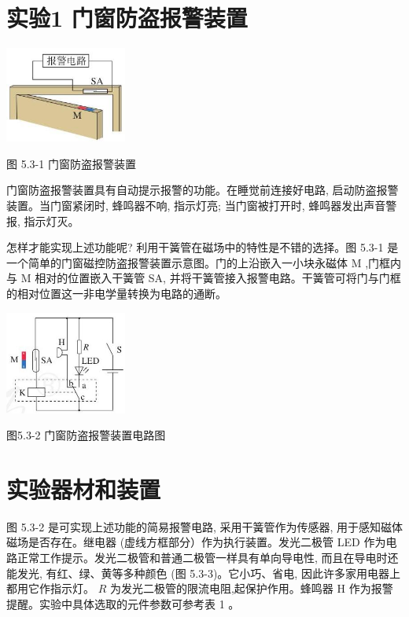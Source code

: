 \documentclass[10pt]{article}
\begin{document}
\section*{实验1 门窗防盗报警装置}

\begin{center}
\includegraphics[max width=0.3\textwidth]{images/01910e72-c5b7-7ed5-a6d4-fb3a5faefc32_108_376185.jpg}
\end{center}

图 5.3-1 门窗防盗报警装置

门窗防盗报警装置具有自动提示报警的功能。在睡觉前连接好电路, 启动防盗报警装置。当门窗紧闭时, 蜂鸣器不响, 指示灯亮; 当门窗被打开时, 蜂鸣器发出声音警报, 指示灯灭。

怎样才能实现上述功能呢? 利用干簧管在磁场中的特性是不错的选择。图 5.3-1 是一个简单的门窗磁控防盗报警装置示意图。门的上沿嵌入一小块永磁体 \(\mathrm{M}\) ,门框内与 \(\mathrm{M}\) 相对的位置嵌入干簧管 SA, 并将干簧管接入报警电路。干簧管可将门与门框的相对位置这一非电学量转换为电路的通断。

\begin{center}
\includegraphics[max width=0.3\textwidth]{images/01910e72-c5b7-7ed5-a6d4-fb3a5faefc32_108_927613.jpg}
\end{center}

图5.3-2 门窗防盗报警装置电路图

\section*{实验器材和装置}

图 5.3-2 是可实现上述功能的简易报警电路, 采用干簧管作为传感器, 用于感知磁体磁场是否存在。继电器 (虚线方框部分）作为执行装置。发光二极管 LED 作为电路正常工作提示。发光二极管和普通二极管一样具有单向导电性, 而且在导电时还能发光, 有红、绿、黄等多种颜色 (图 5.3-3)。它小巧、省电, 因此许多家用电器上都用它作指示灯。 \(R\) 为发光二极管的限流电阻,起保护作用。蜂鸣器 \(\mathrm{H}\) 作为报警提醒。实验中具体选取的元件参数可参考表 1 。
\end{document}

